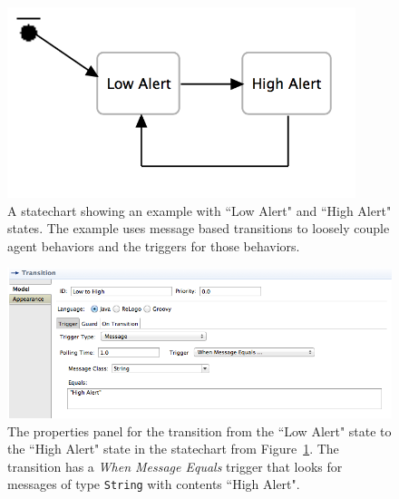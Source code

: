 \documentclass[11pt]{amsart}
\begin{document}
\begin{figure}
\begin{center}
\vspace{.2in}
\centerline {
\includegraphics[width=4in]{StatechartsImages/AlertExample.png}
}
\caption{A statechart showing an example with ``Low Alert" and ``High Alert" states. The example uses message based transitions to loosely couple agent behaviors and the triggers for those behaviors.}
\label{fig:alertExample}
\end{center}
\end{figure}


\begin{figure}
\begin{center}
\vspace{.2in}
\centerline {
\includegraphics[width=5in]{StatechartsImages/AlertProperties.png}
}
\caption{The properties panel for the transition from the ``Low Alert" state to the ``High Alert" state in the statechart from Figure~\ref{fig:alertExample}. The transition has a \emph{When Message Equals} trigger that looks for messages of type \texttt{String} with contents ``High Alert".}
\label{fig:alertProperties}
\end{center}
\end{figure}
\clearpage
\end{document}
